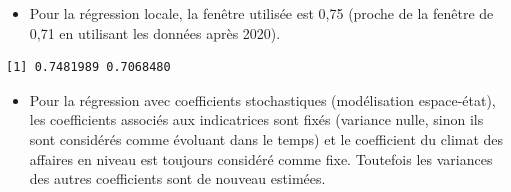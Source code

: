 \documentclass[
  a4paper,
  DIV=11,
  numbers=noendperiod,
  french]{scrartcl}
\newenvironment{Shaded}{\begin{snugshade}}{\end{snugshade}}
\newcommand{\AttributeTok}[1]{\textcolor[rgb]{0.40,0.45,0.13}{#1}}
\newcommand{\ConstantTok}[1]{\textcolor[rgb]{0.56,0.35,0.01}{#1}}
\newcommand{\DecValTok}[1]{\textcolor[rgb]{0.68,0.00,0.00}{#1}}
\newcommand{\FloatTok}[1]{\textcolor[rgb]{0.68,0.00,0.00}{#1}}
\newcommand{\FunctionTok}[1]{\textcolor[rgb]{0.28,0.35,0.67}{#1}}
\newcommand{\NormalTok}[1]{\textcolor[rgb]{0.00,0.23,0.31}{#1}}
\newcommand{\OtherTok}[1]{\textcolor[rgb]{0.00,0.23,0.31}{#1}}
\newcommand{\SpecialCharTok}[1]{\textcolor[rgb]{0.37,0.37,0.37}{#1}}
\newcommand{\StringTok}[1]{\textcolor[rgb]{0.13,0.47,0.30}{#1}}
\providecommand{\tightlist}{%
  \setlength{\itemsep}{0pt}\setlength{\parskip}{0pt}}\usepackage{longtable,booktabs,array}
\newcommand\1{{\mathds 1}}
\theoremstyle{remark}
\begin{document}
\begin{itemize}
\tightlist
\item
  Pour la régression locale, la fenêtre utilisée est 0,75 (proche de la
  fenêtre de 0,71 en utilisant les données après 2020).
\end{itemize}

\begin{Shaded}
\end{Shaded}

\begin{verbatim}
[1] 0.7481989 0.7068480
\end{verbatim}

\begin{itemize}
\tightlist
\item
  Pour la régression avec coefficients stochastiques (modélisation
  espace-état), les coefficients associés aux indicatrices sont fixés
  (variance nulle, sinon ils sont considérés comme évoluant dans le
  temps) et le coefficient du climat des affaires en niveau est toujours
  considéré comme fixe. Toutefois les variances des autres coefficients
  sont de nouveau estimées.
\end{itemize}

\begin{Shaded}
\end{Shaded}
\end{document}
